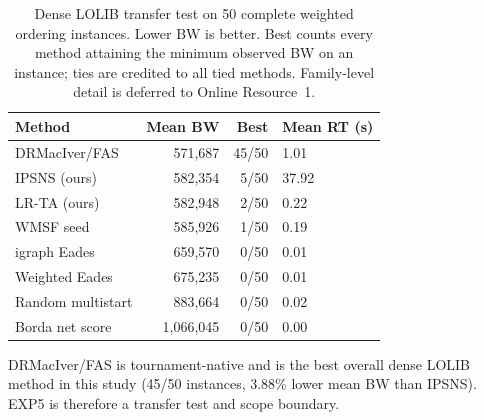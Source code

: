 \begin{table}[t]
\centering
\scriptsize
\setlength{\tabcolsep}{3.5pt}
\caption{Dense LOLIB transfer test on 50 complete weighted ordering instances. Lower BW is better. Best counts every method attaining the minimum observed BW on an instance; ties are credited to all tied methods. Family-level detail is deferred to Online Resource~1.}
\label{tab:lolib-scope}
\begin{tabularx}{\linewidth}{@{}lrrX@{}}
\toprule
Method & Mean BW & Best & Mean RT (s) \\
\midrule
DRMacIver/FAS & 571,687 & 45/50 & 1.01 \\
IPSNS (ours) & 582,354 & 5/50 & 37.92 \\
LR-TA (ours) & 582,948 & 2/50 & 0.22 \\
WMSF seed & 585,926 & 1/50 & 0.19 \\
igraph Eades & 659,570 & 0/50 & 0.01 \\
Weighted Eades & 675,235 & 0/50 & 0.01 \\
Random multistart & 883,664 & 0/50 & 0.02 \\
Borda net score & 1,066,045 & 0/50 & 0.00 \\
\bottomrule
\end{tabularx}
\vspace{2pt}

{\footnotesize\raggedright DRMacIver/FAS is tournament-native and is the best overall dense LOLIB method in this study (45/50 instances, 3.88\% lower mean BW than IPSNS). EXP5 is therefore a transfer test and scope boundary.}
\end{table}
